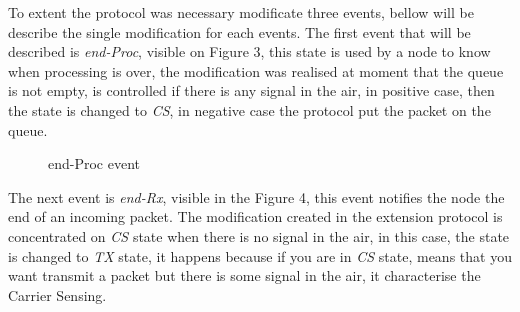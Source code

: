 \documentclass[conference]{IEEEtran}
\begin{document}
To extent the protocol was necessary modificate three events, bellow will be describe the single modification for each events. The first event that will be described is \textit{end-Proc}, visible on Figure 3, this state is used by a node to know when processing is over, the modification was realised at moment that the queue is not empty, is controlled if there is any signal in the air, in positive case, then the state is changed to \textit{CS}, in negative case the protocol put the packet on the queue. 

\begin{figure}[H]
	\centering
	\caption{end-Proc event}
\end{figure}

 The next event is \textit{end-Rx}, visible in the Figure 4, this event notifies the node the end of an incoming packet. The modification created in the extension protocol is concentrated on \textit{CS} state when there is no signal in the air, in this case, the state is changed to \textit{TX} state, it happens because if you are in \textit{CS} state, means that you want transmit a packet but there is some signal in the air, it characterise the Carrier Sensing.
\end{document}
